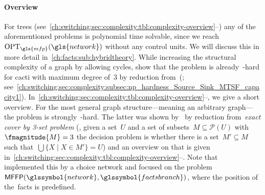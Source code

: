 \paragraph{Overview}
\label{ch:facts:sec:complexity:overview}
%
For trees
(see~\cref{ch:switching:sec:complexity:tbl:complexity-overview}--) any
of the aforementioned problems is polynomial time solvable, since we
reach~$\opt_{\gls{mfp}}(\gls{network})$ without any control units. We will
discuss this in more detail in~\cref{ch:facts:sub:hybridtheory}. While
increasing the structural complexity of a graph by allowing cycles,
\textcite[pp.10ff.; Theorem 4]{Leh15a} show that the problem is already~\NP-hard
for cacti with maximum degree of~$3$ by reduction from~\SSP (\ssp;
see~\cref{ch:switching:sec:complexity:subsec:np_hardness_Source_Sink_MTSF_capacity1}).
In~\cref{ch:switching:sec:complexity:tbl:complexity-overview}--, we
give a short overview. For the most general graph structure---meaning an
arbitrary graph---the problem is strongly~\NP-hard. The latter was shown
by~\textcite[pp. 7; Theorem 1]{Leh15a} by reduction from~\emph{exact cover by
3-set problem} (\ie, given a set~$U$ and a set of subsets~$M\subseteq
\mathcal{P}(U)$ with~$\fmagnitude{M}=3$ the decision problem is whether there is
a set~$M'\subseteq M$ such that~$\bigcup\{X\mid X\in M'\} = U$) and an overview
on that is given
in~\cref{ch:switching:sec:complexity:tbl:complexity-overview}--. Note
that~\textcite{Leh15a} implemented this by a choice network and focused on the
problem~$\mffp(\glssymbol{network},\glssymbol{factsbranch})$, where the position
of the~\gls{facts} is predefined.
%
\begin{landscape}
    \begin{table}
        
        \caption[Overview of results on the complexity of FACTS
        placement.] {Overview of known results on the complexity of
        the~\gls{mff} and~\gls{off} problem. The complexity increases
        from top to bottom as shown in the hardness column. Note that the main
        points that influence the complexity of the problem are the graph
        structure of~, the number of 
        {generators~$\glssymbol{generators}$}, the number of 
        {consumers~$\glssymbol{consumers}$}, the
        , and the
        . 
        }%
        \label{ch:switching:sec:complexity:tbl:complexity-overview}
    \end{table}
\end{landscape}

